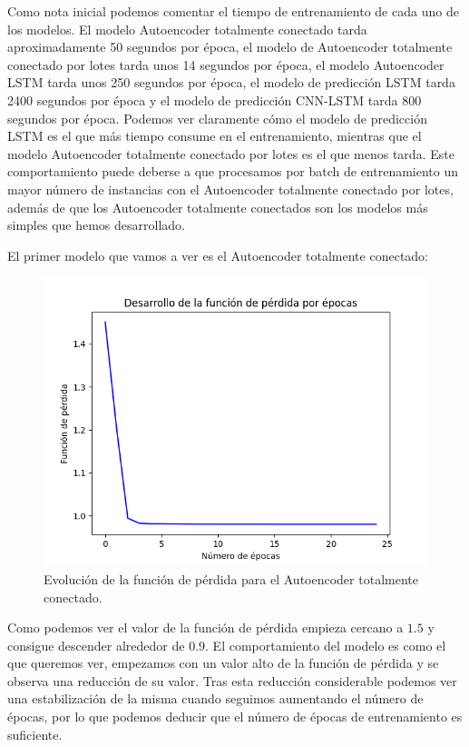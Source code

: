 Como nota inicial podemos comentar el tiempo de entrenamiento de cada uno de los modelos. El modelo Autoencoder totalmente conectado tarda aproximadamente 50 segundos por época, el modelo de Autoencoder totalmente conectado por lotes tarda unos 14 segundos por época, el modelo Autoencoder LSTM tarda unos 250 segundos por época, el modelo de predicción LSTM tarda 2400 segundos por época y el modelo de predicción CNN-LSTM tarda 800 segundos por época. Podemos ver claramente cómo el modelo de predicción LSTM es el que más tiempo consume en el entrenamiento, mientras que el modelo Autoencoder totalmente conectado por lotes es el que menos tarda. Este comportamiento puede deberse a que procesamos por batch de entrenamiento un mayor número de instancias con el Autoencoder totalmente conectado por lotes, además de que los Autoencoder totalmente conectados son los modelos más simples que hemos desarrollado.

El primer modelo que vamos a ver es el Autoencoder totalmente conectado:
\begin{figure}[H]
	\centering
	\includegraphics[scale=0.75]{imagenes/loss_autoencoder_fully_connected.png}
	\caption{Evolución de la función de pérdida para el Autoencoder totalmente conectado.}
	\label{img:loss-autoencoder-fully-connected}
\end{figure}

Como podemos ver el valor de la función de pérdida empieza cercano a $1.5$ y consigue descender alrededor de $0.9$. El comportamiento del modelo es como el que queremos ver, empezamos con un valor alto de la función de pérdida y se observa una reducción de su valor. Tras esta reducción considerable podemos ver una estabilización de la misma cuando seguimos aumentando el número de épocas, por lo que podemos deducir que el número de épocas de entrenamiento es suficiente.

